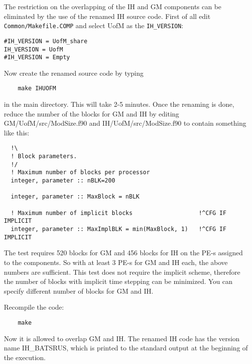 The restriction on the overlapping of the IH and GM components
can be eliminated by the use of the renamed IH source code. 
First of all edit {\tt Common/Makefile.COMP} and
select UofM as the {\tt IH\_VERSION}:
\begin{verbatim}
#IH_VERSION = UofM_share
IH_VERSION = UofM
#IH_VERSION = Empty
\end{verbatim}
Now create the renamed source code by typing
\begin{verbatim}
	make IHUOFM
\end{verbatim}
in the main directory. This will take 2-5 minutes. Once the renaming
is done, reduce the number of the blocks for GM and IH by editing
GM/UofM/src/ModSize.f90 and IH/UofM/src/ModSize.f90 to contain
something like this:
\begin{verbatim}
  !\
  ! Block parameters.
  !/
  ! Maximum number of blocks per processor
  integer, parameter :: nBLK=200

  integer, parameter :: MaxBlock = nBLK

  ! Maximum number of implicit blocks                   !^CFG IF IMPLICIT
  integer, parameter :: MaxImplBLK = min(MaxBlock, 1)   !^CFG IF IMPLICIT
\end{verbatim}
The test requires 520 blocks for GM and 456 blocks for IH on the PE-s
assigned to the components. So with at least 3 PE-s for GM and IH each,
the above numbers are sufficient. This test does not require the implicit
scheme, therefore the number of blocks with implicit time stepping can
be minimized. You can specify different number of blocks for GM and IH. 

Recompile the code:
\begin{verbatim}
	make
\end{verbatim}
Now it is allowed to overlap GM and IH. The renamed IH code has the 
version name IH\_BATSRUS, which is printed to the standard output at the
beginning of the execution.


%
